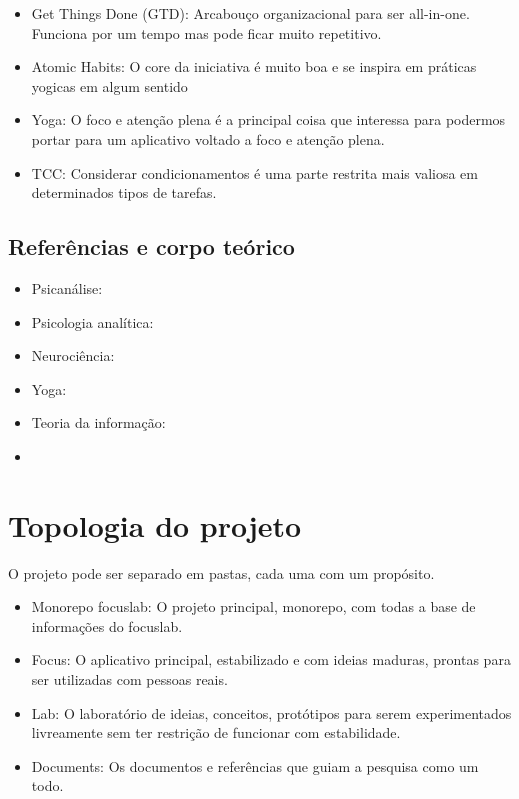 \documentclass[11pt]{article}
\begin{document}
\begin{itemize}
\item Get Things Done (GTD): Arcabouço organizacional para ser all-in-one. Funciona por um tempo mas pode ficar muito repetitivo.
\item Atomic Habits: O core da iniciativa é muito boa e se inspira em práticas yogicas em algum sentido
\item Yoga: O foco e atenção plena é a principal coisa que interessa para podermos portar para um aplicativo voltado a foco e atenção plena.
\item TCC: Considerar condicionamentos é uma parte restrita mais valiosa em determinados tipos de tarefas.
\end{itemize}

\subsection{Referências e corpo teórico}

\begin{itemize}
\item Psicanálise: 
\item Psicologia analítica:
\item Neurociência:
\item Yoga:
\item Teoria da informação:
\item 
\end{itemize}

\section{Topologia do projeto}

O projeto pode ser separado em pastas, cada uma com um propósito.
\begin{itemize}
    \item Monorepo focuslab: O projeto principal, monorepo, com todas a base de informações do focuslab.
    \item Focus: O aplicativo principal, estabilizado e com ideias maduras, prontas para ser utilizadas com pessoas reais.
    \item Lab: O laboratório de ideias, conceitos, protótipos para serem experimentados livreamente sem ter restrição de funcionar com estabilidade.
    \item Documents: Os documentos e referências que guiam a pesquisa como um todo.
\end{itemize}
\end{document}
